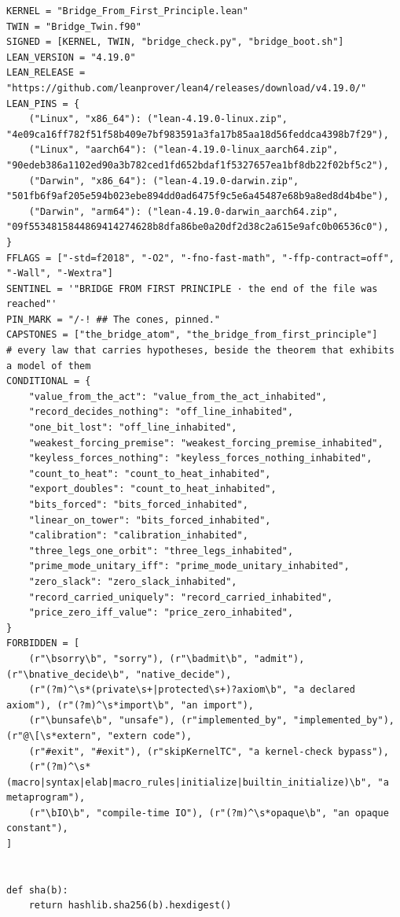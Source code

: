 \documentclass[10pt,twocolumn]{article}
\begin{document}
\begin{Verbatim}
KERNEL = "Bridge_From_First_Principle.lean"
TWIN = "Bridge_Twin.f90"
SIGNED = [KERNEL, TWIN, "bridge_check.py", "bridge_boot.sh"]
LEAN_VERSION = "4.19.0"
LEAN_RELEASE = "https://github.com/leanprover/lean4/releases/download/v4.19.0/"
LEAN_PINS = {
    ("Linux", "x86_64"): ("lean-4.19.0-linux.zip", "4e09ca16ff782f51f58b409e7bf983591a3fa17b85aa18d56feddca4398b7f29"),
    ("Linux", "aarch64"): ("lean-4.19.0-linux_aarch64.zip", "90edeb386a1102ed90a3b782ced1fd652bdaf1f5327657ea1bf8db22f02bf5c2"),
    ("Darwin", "x86_64"): ("lean-4.19.0-darwin.zip", "501fb6f9af205e594b023ebe894dd0ad6475f9c5e6a45487e68b9a8ed8d4b4be"),
    ("Darwin", "arm64"): ("lean-4.19.0-darwin_aarch64.zip", "09f5534815844869414274628b8dfa86be0a20df2d38c2a615e9afc0b06536c0"),
}
FFLAGS = ["-std=f2018", "-O2", "-fno-fast-math", "-ffp-contract=off", "-Wall", "-Wextra"]
SENTINEL = '"BRIDGE FROM FIRST PRINCIPLE · the end of the file was reached"'
PIN_MARK = "/-! ## The cones, pinned."
CAPSTONES = ["the_bridge_atom", "the_bridge_from_first_principle"]
# every law that carries hypotheses, beside the theorem that exhibits a model of them
CONDITIONAL = {
    "value_from_the_act": "value_from_the_act_inhabited",
    "record_decides_nothing": "off_line_inhabited",
    "one_bit_lost": "off_line_inhabited",
    "weakest_forcing_premise": "weakest_forcing_premise_inhabited",
    "keyless_forces_nothing": "keyless_forces_nothing_inhabited",
    "count_to_heat": "count_to_heat_inhabited",
    "export_doubles": "count_to_heat_inhabited",
    "bits_forced": "bits_forced_inhabited",
    "linear_on_tower": "bits_forced_inhabited",
    "calibration": "calibration_inhabited",
    "three_legs_one_orbit": "three_legs_inhabited",
    "prime_mode_unitary_iff": "prime_mode_unitary_inhabited",
    "zero_slack": "zero_slack_inhabited",
    "record_carried_uniquely": "record_carried_inhabited",
    "price_zero_iff_value": "price_zero_inhabited",
}
FORBIDDEN = [
    (r"\bsorry\b", "sorry"), (r"\badmit\b", "admit"), (r"\bnative_decide\b", "native_decide"),
    (r"(?m)^\s*(private\s+|protected\s+)?axiom\b", "a declared axiom"), (r"(?m)^\s*import\b", "an import"),
    (r"\bunsafe\b", "unsafe"), (r"implemented_by", "implemented_by"), (r"@\[\s*extern", "extern code"),
    (r"#exit", "#exit"), (r"skipKernelTC", "a kernel-check bypass"),
    (r"(?m)^\s*(macro|syntax|elab|macro_rules|initialize|builtin_initialize)\b", "a metaprogram"),
    (r"\bIO\b", "compile-time IO"), (r"(?m)^\s*opaque\b", "an opaque constant"),
]


def sha(b):
    return hashlib.sha256(b).hexdigest()



\end{Verbatim}
\end{document}
